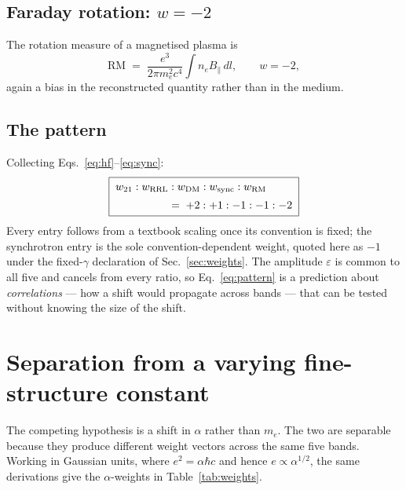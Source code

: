 \documentclass[aps,prd,twocolumn,superscriptaddress,nofootinbib,10pt]{revtex4-2}
\begin{document}
\subsection{Faraday rotation: $w = -2$}

The rotation measure of a magnetised plasma is~\cite{BrentjensDeBruyn2005}
%
\begin{equation}
  \mathrm{RM} \;=\; \frac{e^{3}}{2\pi m_e^{2} c^{4}} \int n_e B_\parallel \, dl ,
  \qquad w = -2 ,
\end{equation}
%
again a bias in the reconstructed quantity rather than in the medium.

\subsection{The pattern}

Collecting Eqs.~\eqref{eq:hf}--\eqref{eq:sync}:
%
\begin{equation}
  \boxed{\;
  \begin{aligned}
    w_{21} : w_{\rm RRL} &: w_{\rm DM} : w_{\rm sync} : w_{\rm RM} \\[2pt]
    &=\; +2 : +1 : -1 : -1 : -2
  \end{aligned}
  \;}
  \label{eq:pattern}
\end{equation}
%
Every entry follows from a textbook scaling once its convention is fixed; the synchrotron entry is
the sole convention-dependent weight, quoted here as $-1$ under the fixed-$\gamma$ declaration of
Sec.~\ref{sec:weights}. The amplitude $\varepsilon$ is common to all five and cancels from every
ratio, so Eq.~\eqref{eq:pattern} is a prediction about \emph{correlations} --- how a shift would
propagate across bands --- that can be tested without knowing the size of the shift.

\section{Separation from a varying fine-structure constant}\label{sec:alpha}

The competing hypothesis is a shift in $\alpha$ rather than $m_e$. The two are separable because
they produce different weight vectors across the same five bands. Working in Gaussian units, where
$e^{2} = \alpha \hbar c$ and hence $e \propto \alpha^{1/2}$, the same derivations give the
$\alpha$-weights in Table~\ref{tab:weights}.
\end{document}
